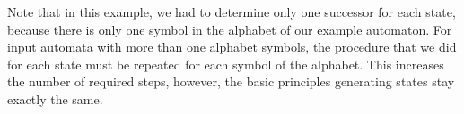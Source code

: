 Note that in this example, we had to determine only one successor for each state, because there is only one symbol in the alphabet of our example automaton. For input automata with more than one alphabet symbols, the procedure that we did for each state must be repeated for each symbol of the alphabet. This increases the number of required steps, however, the basic principles generating states stay exactly the same.










